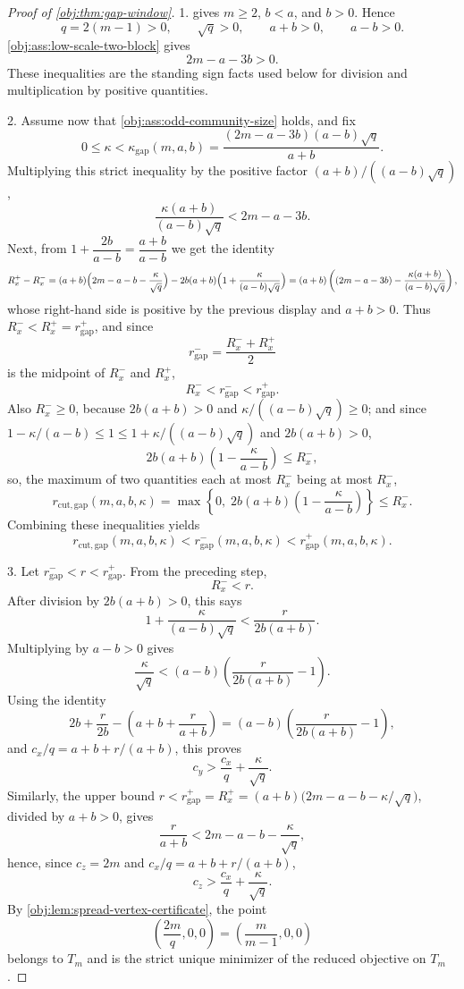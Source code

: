 \begin{proof}[Proof of \cref{obj:thm:gap-window}]
1.   gives \(m\ge2\), \(b<a\), and \(b>0\). Hence
\[
q=2(m-1)>0,\qquad \sqrt q>0,\qquad a+b>0,\qquad a-b>0.
\]
\cref{obj:ass:low-scale-two-block} gives
\[
2m-a-3b>0.
\]
These inequalities are the standing sign facts used below for division and multiplication by positive quantities.  %

2.  Assume now that \cref{obj:ass:odd-community-size} holds, and fix
\[
0\le \kappa<\kappa_{\mathrm{gap}}(m,a,b)=\frac{(2m-a-3b)(a-b)\sqrt q}{a+b}.
\]
Multiplying this strict inequality by the positive factor \((a+b)/((a-b)\sqrt q)\),
\[
\frac{\kappa(a+b)}{(a-b)\sqrt q}<2m-a-3b.
\]
Next, from \(1+\dfrac{2b}{a-b}=\dfrac{a+b}{a-b}\) we get the identity
\[
R_x^+-R_x^-
=(a+b)\Bigl(2m-a-b-\frac{\kappa}{\sqrt q}\Bigr)-2b(a+b)\Bigl(1+\frac{\kappa}{(a-b)\sqrt q}\Bigr)
=(a+b)\left((2m-a-3b)-\frac{\kappa(a+b)}{(a-b)\sqrt q}\right),
\]
whose right-hand side is positive by the previous display and \(a+b>0\).  Thus \(R_x^-<R_x^+=r_{\mathrm{gap}}^+\), and since
\[
r_{\mathrm{gap}}^-=\frac{R_x^-+R_x^+}{2}
\]
is the midpoint of \(R_x^-\) and \(R_x^+\),
\[
R_x^-<r_{\mathrm{gap}}^-<r_{\mathrm{gap}}^+.
\]
Also \(R_x^-\ge0\), because \(2b(a+b)>0\) and \(\kappa/((a-b)\sqrt q)\ge0\); and since \(1-\kappa/(a-b)\le1\le1+\kappa/((a-b)\sqrt q)\) and \(2b(a+b)>0\),
\[
2b(a+b)\left(1-\frac{\kappa}{a-b}\right)\le R_x^-,
\]
so, the maximum of two quantities each at most \(R_x^-\) being at most \(R_x^-\),
\[
r_{\mathrm{cut,gap}}(m,a,b,\kappa)
=\max\left\{0,\;2b(a+b)\left(1-\frac{\kappa}{a-b}\right)\right\}
\le R_x^-.
\]
Combining these inequalities yields
\[
r_{\mathrm{cut,gap}}(m,a,b,\kappa)
<
r_{\mathrm{gap}}^-(m,a,b,\kappa)
<
r_{\mathrm{gap}}^+(m,a,b,\kappa).
\]  %

3.  Let \(r_{\mathrm{gap}}^-<r<r_{\mathrm{gap}}^+\). From the preceding step,
\[
R_x^-<r.
\]
After division by \(2b(a+b)>0\), this says
\[
1+\frac{\kappa}{(a-b)\sqrt q}<\frac{r}{2b(a+b)}.
\]
Multiplying by \(a-b>0\) gives
\[
\frac{\kappa}{\sqrt q}
<
(a-b)\left(\frac{r}{2b(a+b)}-1\right).
\]
Using the identity
\[
2b+\frac r{2b}-\left(a+b+\frac r{a+b}\right)
=
(a-b)\left(\frac{r}{2b(a+b)}-1\right),
\]
and \(c_x/q=a+b+r/(a+b)\), this proves
\[
c_y>\frac{c_x}{q}+\frac{\kappa}{\sqrt q}.
\]
Similarly, the upper bound \(r<r_{\mathrm{gap}}^+=R_x^+=(a+b)\bigl(2m-a-b-\kappa/\sqrt q\bigr)\), divided by \(a+b>0\), gives
\[
\frac r{a+b}<2m-a-b-\frac{\kappa}{\sqrt q},
\]
hence, since \(c_z=2m\) and \(c_x/q=a+b+r/(a+b)\),
\[
c_z>\frac{c_x}{q}+\frac{\kappa}{\sqrt q}.
\]
By \cref{obj:lem:spread-vertex-certificate}, the point
\[
\left(\frac{2m}{q},0,0\right)=\left(\frac{m}{m-1},0,0\right)
\]
belongs to \(T_m\) and is the strict unique minimizer of the reduced objective on \(T_m\).  %


\end{proof}
